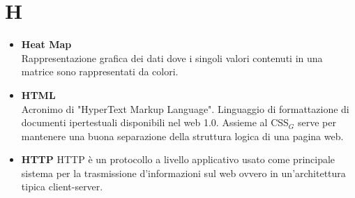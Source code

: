 \chapter{H} \label{H}
\begin{itemize}
	\item \textbf{Heat Map} \\
	 Rappresentazione grafica dei dati dove i singoli valori contenuti in una matrice sono rappresentati da colori.

	 \item \textbf{HTML} \\
	 Acronimo di "HyperText Markup Language".
	 Linguaggio di formattazione di documenti ipertestuali disponibili nel web 1.0.
	 Assieme al CSS$_G$ serve per mantenere una buona separazione della struttura logica di una pagina web.
	 
	 \item \textbf{HTTP}
	 HTTP è un protocollo a livello applicativo usato come principale sistema per la trasmissione d'informazioni sul web ovvero in un'architettura tipica client-server.
\end{itemize}

